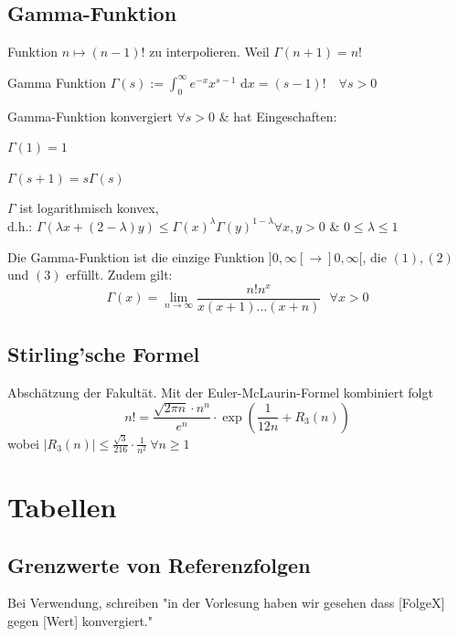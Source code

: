 \documentclass[a4paper]{article}
\def\limn{\lim_{n\to \infty}}
\def\dx{\text{ d}x}
\begin{document}
\subsection{Gamma-Funktion}
Funktion $n \mapsto (n-1)!$ zu interpolieren. Weil $\Gamma(n+1) = n!$ \\
\begin{mainbox}{Gamma Funktion}
 $\Gamma(s) := \int_0^\infty e^{-x}x^{s-1}\dx = (s-1)! \quad \forall s > 0$
\end{mainbox}
Gamma-Funktion konvergiert $\forall s > 0$ \& hat Eingeschaften:
\begin{inparaitem}[leftmargin=4.5mm, topsep=1pt, parsep=1pt]
  \item $\Gamma(1) = 1$
  \item $\Gamma(s + 1) = s \Gamma(s)$
  \item $\Gamma$ ist logarithmisch konvex, \\
        d.h.: $\Gamma(\lambda x + (2 - \lambda)y) \leq \Gamma(x)^\lambda \Gamma(y)^{1 - \lambda} \forall x, y > 0$ \& $0 \leq \lambda \leq 1$
\end{inparaitem}
Die Gamma-Funktion ist die einzige Funktion $]0, \infty[ \to ]0, \infty[$, die $(1), (2)$ und $(3)$ erfüllt. Zudem gilt: $$\Gamma(x) = \limn \frac{n!n^x}{x(x+1)...(x+n)} \ \ \ \forall x > 0$$

\subsection{Stirling'sche Formel}
Abschätzung der Fakultät. Mit der Euler-McLaurin-Formel kombiniert folgt
$$n! = \frac{\sqrt{2\pi n} \cdot n^n}{e^n} \cdot \exp(\frac{1}{12n}+R_3(n))$$
wobei $|R_3(n)| \le \frac{\sqrt{3}}{216}\cdot\frac{1}{n^2} \ \forall n \ge 1$



\section{Tabellen}
\subsection{Grenzwerte von Referenzfolgen}
\tiny \color{gray}
  Bei Verwendung, schreiben "in der Vorlesung haben wir gesehen dass [FolgeX] gegen [Wert] konvergiert."
\normalsize \color{black}
\end{document}
